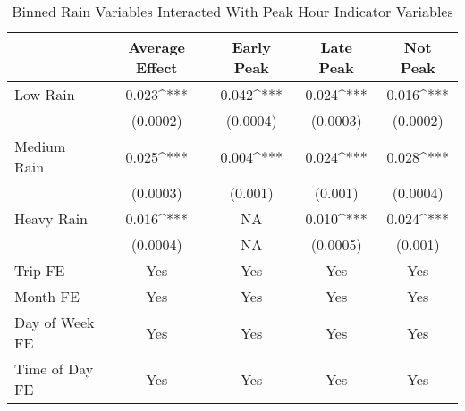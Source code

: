 \captionsetup{labelsep=newline}
\begin{table}[!htbp]
\centering

\caption{Binned Rain Variables Interacted With Peak Hour Indicator Variables}
\label{table:peak-rain}

\begin{tabular}{l c c c c}
\hline
\hline
 & Average Effect & Early Peak & Late Peak & Not Peak\\
 \hline
 Low Rain &  0.023^{***} & 0.042^{***} & 0.024^{***} & 0.016^{***}\\
  & (0.0002) & (0.0004) & (0.0003)  & (0.0002) \\  
 Medium Rain & 0.025^{***} &  0.004^{***} & 0.024^{***} & 0.028^{***} \\ 
  & (0.0003) & (0.001) &  (0.001) & (0.0004) \\ 
 Heavy Rain & 0.016^{***} & NA & 0.010^{***} & 0.024^{***}\\ 
  & (0.0004) & NA & (0.0005)  & (0.001) \\ 
\hline
Trip FE & Yes & Yes & Yes & Yes\\
Month FE & Yes & Yes & Yes & Yes\\
Day of Week FE & Yes & Yes & Yes & Yes\\
Time of Day FE & Yes & Yes & Yes & Yes\\
\hline
\hline
\end{tabular} 

\end{table}